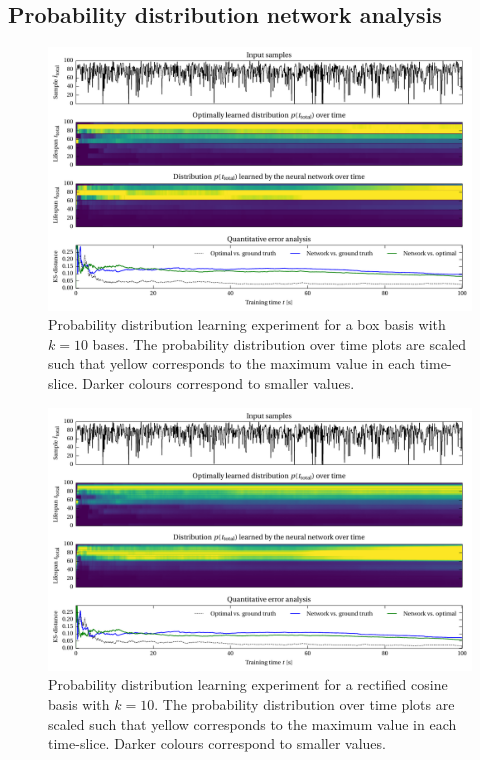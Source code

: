 \documentclass[a4paper,11pt]{article}
\begin{document}
\subsection{Probability distribution network analysis}

\begin{figure}
	\centering
	\includegraphics{media/net_probability_box_10_100000_0.pdf}
	\caption{Probability distribution learning experiment for a box basis with $k = 10$ bases. The probability distribution over time plots are scaled such that yellow corresponds to the maximum value in each time-slice. Darker colours correspond to smaller values.}
	\label{fig:analysis_pdist_box}
\end{figure}
\begin{figure}
    \centering
    \includegraphics{media/net_probability_cosine_10_100000_0.pdf}
    \caption{Probability distribution learning experiment for a rectified cosine basis with $k = 10$. The probability distribution over time plots are scaled such that yellow corresponds to the maximum value in each time-slice. Darker colours correspond to smaller values.}
    \label{fig:analysis_pdist_cos}
\end{figure}
\end{document}

